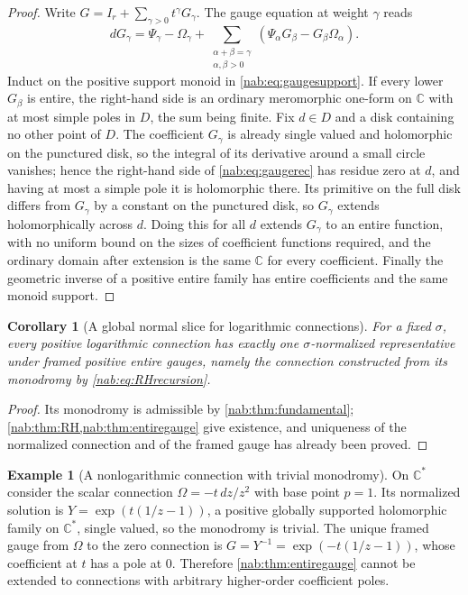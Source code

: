 \documentclass[11pt,letterpaper]{article}
\newtheorem{corollary}[corollary]{Corollary}
\theoremstyle{definition}
\newtheorem{example}[example]{Example}
\theoremstyle{remark}
\newcommand{\C}{\mathbb C}
\numberwithin{equation}{section}
\begin{document}
\begin{proof}
Write $G=I_r+\sum_{\gamma>0}t^\gamma G_\gamma$. The gauge equation at weight
$\gamma$ reads
\begin{equation}\label{nab:eq:gaugerec}
 dG_\gamma=\Psi_\gamma-\Omega_\gamma
 +\sum_{\substack{\alpha+\beta=\gamma\\ \alpha,\beta>0}}
  (\Psi_\alpha G_\beta-G_\beta\Omega_\alpha).
\end{equation}
Induct on the positive support monoid in \eqref{nab:eq:gaugesupport}. If every
lower $G_\beta$ is entire, the right-hand side is an ordinary meromorphic
one-form on $\C$ with at most simple poles in $D$, the sum being finite. Fix
$d\in D$ and a disk containing no other point of $D$. The coefficient
$G_\gamma$ is already single valued and holomorphic on the punctured disk, so
the integral of its derivative around a small circle vanishes; hence the
right-hand side of \eqref{nab:eq:gaugerec} has residue zero at $d$, and having
at most a simple pole it is holomorphic there. Its primitive on the full disk
differs from $G_\gamma$ by a constant on the punctured disk, so $G_\gamma$
extends holomorphically across $d$. Doing this for all $d$ extends $G_\gamma$
to an entire function, with no uniform bound on the sizes of coefficient
functions required, and the ordinary domain after extension is the same $\C$
for every coefficient. Finally the geometric inverse of a positive entire
family has entire coefficients and the same monoid support.
\end{proof}

\begin{corollary}[A global normal slice for logarithmic connections]
\label{nab:cor:slice}
For a fixed $\sigma$, every positive logarithmic connection has exactly one
$\sigma$-normalized representative under framed positive entire gauges, namely
the connection constructed from its monodromy by
\eqref{nab:eq:RHrecursion}.
\end{corollary}

\begin{proof}
Its monodromy is admissible by \cref{nab:thm:fundamental};
\cref{nab:thm:RH,nab:thm:entiregauge} give existence, and uniqueness of the
normalized connection and of the framed gauge has already been proved.
\end{proof}

\begin{example}[A nonlogarithmic connection with trivial monodromy]
\label{nab:ex:nonlog}
On $\C^*$ consider the scalar connection $\Omega=-t\,dz/z^2$ with base point
$p=1$. Its normalized solution is $Y=\exp(t(1/z-1))$, a positive globally
supported holomorphic family on $\C^*$, single valued, so the monodromy is
trivial. The unique framed gauge from $\Omega$ to the zero connection is
$G=Y^{-1}=\exp(-t(1/z-1))$, whose coefficient at $t$ has a pole at $0$.
Therefore \cref{nab:thm:entiregauge} cannot be extended to connections with
arbitrary higher-order coefficient poles.
\end{example}
\end{document}
